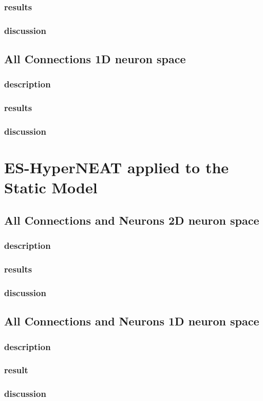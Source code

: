 \subsubsection{results}
\subsubsection{discussion}
\subsection{All Connections 1D neuron space}
\subsubsection{description}
\subsubsection{results}
\subsubsection{discussion}

\section{ES-HyperNEAT applied to the Static Model}
\subsection{All Connections and Neurons 2D neuron space}

\subsubsection{description}
\subsubsection{results}
\subsubsection{discussion}

\subsection{All Connections and Neurons 1D neuron space}

\subsubsection{description}
\subsubsection{result}
\subsubsection{discussion}